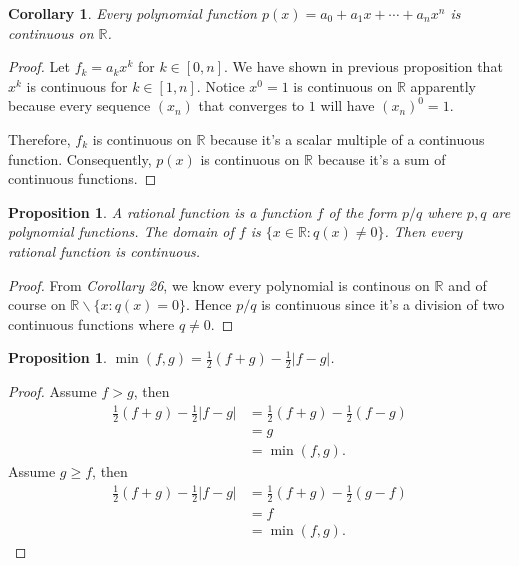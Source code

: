 \documentclass{article}
\newtheorem{proposition}[thm]{Proposition}
\newtheorem{corollary}[thm]{Corollary}
\begin{document}
\begin{corollary}
    Every polynomial function $p(x)=a_0+a_1x+\cdots+a_nx^n$ is continuous on $\mathbb{R}$.
\end{corollary}
\begin{proof}
    Let $f_k = a_kx^k$ for $k\in[0,n]$.
    We have shown in previous proposition that $x^k$ is continuous for $k\in[1,n]$. Notice $x^0=1$ 
    is continuous on $\mathbb{R}$ apparently because every sequence $(x_n)$ that converges to $1$ 
    will have $(x_n)^0=1$.

    Therefore, $f_k$ is continuous on $\mathbb{R}$ because it's a scalar multiple of a continuous 
    function. Consequently, $p(x)$ is continuous on $\mathbb{R}$ because it's a sum of continuous 
    functions.
\end{proof}

\begin{proposition}
    A rational function is a function $f$ of the form $p/q$ where $p,q$ are polynomial functions. 
    The domain of $f$ is $\{x\in\mathbb{R}:q(x)\neq0\}$. Then every rational function is continuous.
\end{proposition}
\begin{proof}
    From \emph{Corollary 26}, we know every polynomial is continous on $\mathbb{R}$ and of course 
    on $\mathbb{R}\backslash \{x:q(x)=0\}$. Hence $p/q$ is continuous since it's a division of two continuous 
    functions where $q\neq0$.
\end{proof}

\begin{proposition}
    $\min(f,g)=\frac{1}{2}(f+g)-\frac{1}{2}|f-g|$.
\end{proposition}
\begin{proof}
    Assume $f>g$, then 
    \begin{align*}
        \frac{1}{2}(f+g) - \frac{1}{2}|f-g| & = \frac{1}{2}(f+g) - \frac{1}{2}(f-g) \\
        & = g \\
        & = \min(f,g).
    \end{align*}
    Assume $g\ge f$, then
    \begin{align*}
        \frac{1}{2}(f+g) - \frac{1}{2}|f-g| & = \frac{1}{2}(f+g) - \frac{1}{2}(g-f) \\
        & = f \\
        & = \min(f,g).
    \end{align*}
\end{proof}
\end{document}
